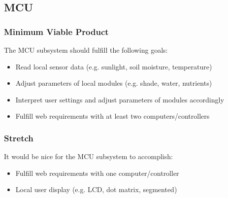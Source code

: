 \subsection{MCU}
\subsubsection{Minimum Viable Product}
The MCU subsystem should fulfill the following goals:
\begin{itemize}
    \item Read local sensor data (e.g. sunlight, soil moisture, temperature)
    \item Adjust parameters of local modules (e.g. shade, water, nutrients)
    \item Interpret user settings and adjust parameters of modules accordingly
    \item Fulfill web requirements with at least two computers/controllers
\end{itemize}
\subsubsection{Stretch}
It would be nice for the MCU subsystem to accomplish:
\begin{itemize}
    \item Fulfill web requirements with one computer/controller
    \item Local user display (e.g. LCD, dot matrix, segmented)
\end{itemize}